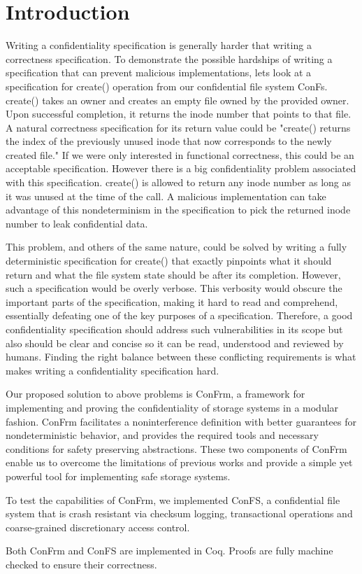 
\section{Introduction}

Writing a confidentiality specification is generally harder that writing a correctness specification. To demonstrate the possible hardships of writing a specification that can prevent malicious implementations, lets look at a specification for create() operation from our confidential file system ConFs. create() takes an owner and creates an empty file owned by the provided owner. Upon successful completion, it returns the inode number that points to that file. A natural correctness specification for its return value could be "create() returns the index of the previously unused inode that now corresponds to the newly created file." If we were only interested in functional correctness, this could be an acceptable specification. However there is a big confidentiality problem  associated with this specification. create() is allowed to return any inode number as long as it was unused at the time of the call. A malicious implementation can take advantage of this nondeterminism in the specification to pick the returned inode number to leak confidential data.

This problem, and others of the same nature, could be solved by writing a fully deterministic specification for create() that exactly pinpoints what it should return and what the file system state should be after its completion. However, such a specification would be overly verbose. This verbosity would obscure the important parts of the specification, making it hard to read and comprehend, essentially defeating one of the key purposes of a specification. Therefore, a good confidentiality specification should address such vulnerabilities in its scope but also should be clear and concise so it can be read, understood and reviewed by humans. Finding the right balance between these conflicting requirements is what makes writing a confidentiality specification hard.

Our proposed solution to above problems is ConFrm, a framework for implementing and proving the confidentiality of storage systems in a modular fashion. ConFrm facilitates a noninterference definition with better guarantees for nondeterministic behavior, and provides the required tools and necessary conditions for safety preserving abstractions. These two components of ConFrm enable us to overcome the limitations of previous works and provide a simple yet powerful tool for implementing safe storage systems. 

To test the capabilities of ConFrm, we implemented ConFS, a confidential file system that is crash resistant via checksum logging, transactional operations and coarse-grained discretionary access control. 

Both ConFrm and ConFS are implemented in Coq. Proofs are fully machine checked to ensure their correctness.

